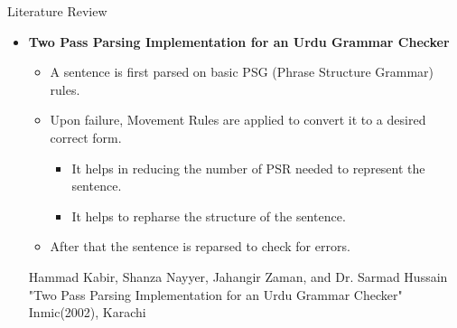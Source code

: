 \documentclass{beamer}
\begin{document}
\begin{frame}{Literature Review}
\begin{itemize}
	\vspace{0.5em}
	\item \textbf{Two Pass Parsing Implementation for an Urdu Grammar Checker} \\
	\vspace{1em}
	\begin{itemize}
		\item A sentence is first parsed on basic PSG (Phrase Structure Grammar) rules.  \\
		\vspace{0.5em}
		\item Upon failure, Movement Rules are applied to convert it to a desired correct form. \\ 
		\begin{itemize}
			\item It helps in reducing the number of PSR needed to represent the sentence.
			\item It helps to repharse the structure of the sentence.
		\end{itemize}
		\vspace{0.5em}
		\item After that the sentence is reparsed to check for errors.\\
		\vspace{2em}	
	\end{itemize}
	\footnotesize \color{blue}Hammad Kabir, Shanza Nayyer, Jahangir Zaman, and Dr. Sarmad Hussain
	\color{black} {"Two Pass Parsing Implementation for an Urdu Grammar Checker"} 
	\color{blue} Inmic(2002), Karachi
\end{itemize}
\end{frame}


\end{document}
